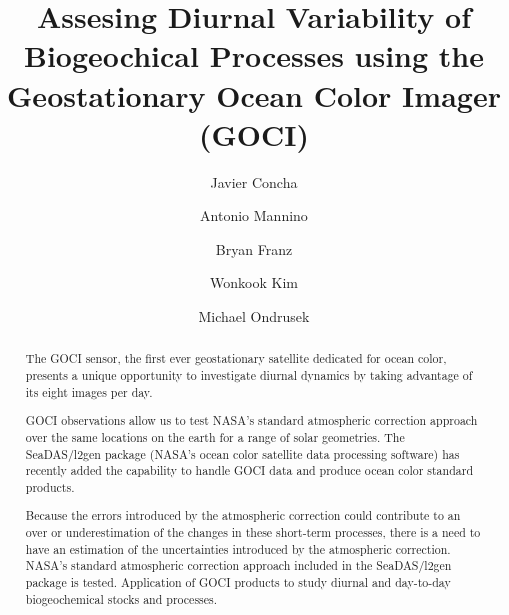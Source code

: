 \documentclass[onecolumn,3p,letterpaper,11pt]{elsarticle}
\begin{document}

\begin{frontmatter}

\title{Assesing Diurnal Variability of Biogeochical Processes using the Geostationary Ocean Color Imager (GOCI)}


\author[oeladdress,usraaddress]{Javier Concha}

\author[oeladdress]{Antonio Mannino}

\author[oeladdress]{Bryan Franz}

\author[kiostaddress]{Wonkook Kim}

\author[usgsaddress]{Michael Ondrusek}

\address[oeladdress]{Ocean Ecology lab, NASA Goddard Space Flight Center, Greenbelt, MD, USA}
\address[usraaddress]{Universities Space Research Association, Columbia, MD, USA}
\address[kiostaddress]{Korea Institute of Ocean Science and Technology, 787 Haean-ro, Ansan, Republic of Korea}

\address[usgsaddress]{NOAA/NESDIS Center for Weather and Climate Prediction, College Park, Maryland, USA}
\begin{abstract}

The GOCI sensor, the first ever geostationary satellite dedicated for ocean color, presents a unique opportunity to investigate diurnal dynamics by taking advantage of its eight images per day.
%

GOCI observations allow us to test NASA’s standard atmospheric correction approach over the same locations on the earth for a range of solar geometries.
%
The SeaDAS/l2gen package (NASA’s ocean color satellite data processing software) has recently added the capability to handle GOCI data and produce ocean color standard products.

%

%
Because the errors introduced by the atmospheric correction could contribute to an over or underestimation of the changes in these short-term processes, there is a need to have an estimation of the uncertainties introduced by the atmospheric correction.
%
NASA’s standard atmospheric correction approach included in the SeaDAS/l2gen package is tested.
%
Application of GOCI products to study diurnal and day-to-day biogeochemical stocks and processes.


\end{abstract}
\end{frontmatter}
\end{document}
